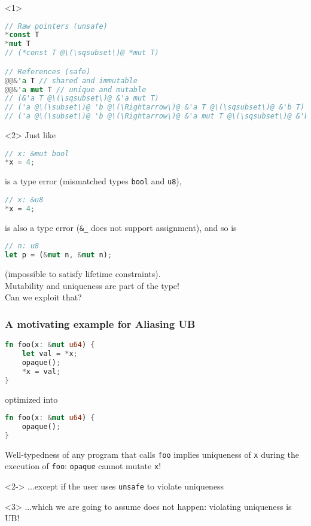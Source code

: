 \begin{frame}[fragile, t]
    \begin{onlyenv}<1>
        \begin{lstlisting}[language=rust, escapechar=@]
// Raw pointers (unsafe)
*const T
*mut T
// (*const T @\(\sqsubset\)@ *mut T)

// References (safe)
@@&'a T // shared and immutable
@@&'a mut T // unique and mutable
// (&'a T @\(\sqsubset\)@ &'a mut T)
// ('a @\(\subset\)@ 'b @\(\Rightarrow\)@ &'a T @\(\sqsubset\)@ &'b T)
// ('a @\(\subset\)@ 'b @\(\Rightarrow\)@ &'a mut T @\(\sqsubset\)@ &'b mut T)
        \end{lstlisting}
    \end{onlyenv}

    \begin{onlyenv}<2>
        Just like
        \begin{lstlisting}[language=rust]
// x: &mut bool
*x = 4;
        \end{lstlisting}
        is a type error (mismatched types \texttt{bool} and \texttt{u8}),
        \begin{lstlisting}[language=rust]
// x: &u8
*x = 4;
        \end{lstlisting}
        is also a type error (\texttt{\&\_} does not support assignment),
        and so is
        \begin{lstlisting}[language=rust]
// n: u8
let p = (&mut n, &mut n);
        \end{lstlisting}
        (impossible to satisfy lifetime constraints).\\

        Mutability and uniqueness are part of the type!\\
        Can we exploit that?
    \end{onlyenv}
\end{frame}

\begin{frame}[fragile, t]
    \frametitle{A motivating example for Aliasing UB}
    \begin{lstlisting}[language=rust]
fn foo(x: &mut u64) {
    let val = *x;
    opaque();
    *x = val;
}
    \end{lstlisting}
    optimized into
    \begin{lstlisting}[language=rust]
fn foo(x: &mut u64) {
    opaque();
}
    \end{lstlisting}
    Well-typedness of any program that calls \texttt{foo} implies uniqueness
    of \texttt{x} during the execution of \texttt{foo}: \texttt{opaque} cannot mutate \texttt{x}!\\
    \begin{onlyenv}<2->
    ...except if the user uses \texttt{unsafe} to violate uniqueness \\
    \end{onlyenv}
    \begin{onlyenv}<3>
    ...which we are going to assume does not happen: violating uniqueness is UB!
    \end{onlyenv}
\end{frame}

